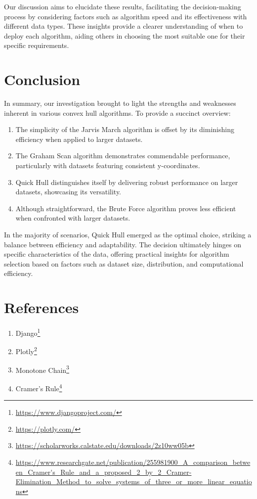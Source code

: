 \documentclass[10pt,twocolumn]{article}
\begin{document}
    Our discussion aims to elucidate these results, facilitating the decision-making process by considering factors such as algorithm speed and its effectiveness with different data types. These insights provide a clearer understanding of when to deploy each algorithm, aiding others in choosing the most suitable one for their specific requirements.

\section{Conclusion}
    In summary, our investigation brought to light the strengths and weaknesses inherent in various convex hull algorithms. To provide a succinct overview:
    \begin{enumerate}
    \item The simplicity of the Jarvis March algorithm is offset by its diminishing efficiency when applied to larger datasets.
    \item The Graham Scan algorithm demonstrates commendable performance, particularly with datasets featuring consistent y-coordinates.
    \item Quick Hull distinguishes itself by delivering robust performance on larger datasets, showcasing its versatility.
    \item Although straightforward, the Brute Force algorithm proves less efficient when confronted with larger datasets.
    \end{enumerate}
    In the majority of scenarios, Quick Hull emerged as the optimal choice, striking a balance between efficiency and adaptability. The decision ultimately hinges on specific characteristics of the data, offering practical insights for algorithm selection based on factors such as dataset size, distribution, and computational efficiency.

\section{References}
    \begin{enumerate}
        \item Django\footnote{\url{https://www.djangoproject.com/}}
        \item Plotly\footnote{\url{https://plotly.com/}}
        \item Monotone Chain\footnote{\url{https://scholarworks.calstate.edu/downloads/2z10ww05b}}
        \item Cramer's Rule\footnote{\url{https://www.researchgate.net/publication/255981900_A_comparison_between_Cramer's_Rule_and_a_proposed_2_by_2_Cramer-Elimination_Method_to_solve_systems_of_three_or_more_linear_equations}}
    \end{enumerate}
\clearpage
\end{document}
